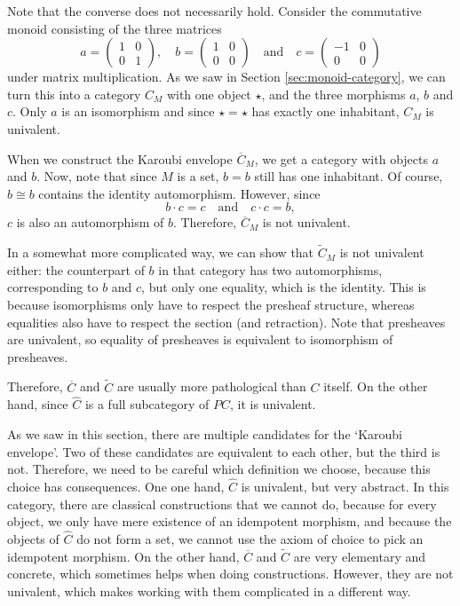 \begin{remark}
  Note that the converse does not necessarily hold. Consider the commutative monoid consisting of the three matrices
  \[
    a = \begin{pmatrix}
      1 & 0\\0 & 1
    \end{pmatrix}, \quad
    b = \begin{pmatrix}
      1 & 0\\0 & 0
    \end{pmatrix} \quad \text{and} \quad
    c = \begin{pmatrix}
      -1 & 0\\0 & 0
    \end{pmatrix}
  \]
  under matrix multiplication. As we saw in Section \ref{sec:monoid-category}, we can turn this into a category $ C_M $ with one object $ \star $, and the three morphisms $ a $, $ b $ and $ c $. Only $ a $ is an isomorphism and since $ \star = \star $ has exactly one inhabitant, $ C_M $ is univalent.

  When we construct the Karoubi envelope $ \overline C_M $, we get a category with objects $ a $ and $ b $. Now, note that since $ M $ is a set, $ b = b $ still has one inhabitant. Of course, $ b \cong b $ contains the identity automorphism. However, since
  \[ b \cdot c = c \quad \text{and} \quad c \cdot c = b, \]
  $ c $ is also an automorphism of $ b $. Therefore, $ \overline C_M $ is not univalent.

  In a somewhat more complicated way, we can show that $ \tilde C_M $ is not univalent either: the counterpart of $ b $ in that category has two automorphisms, corresponding to $ b $ and $ c $, but only one equality, which is the identity. This is because isomorphisms only have to respect the presheaf structure, whereas equalities also have to respect the section (and retraction). Note that presheaves are univalent, so equality of presheaves is equivalent to isomorphism of presheaves.

  Therefore, $ \overline C $ and $ \tilde C $ are usually more pathological than $ C $ itself. On the other hand, since $ \hat C $ is a full subcategory of $ PC $, it is univalent.
\end{remark}

\begin{remark}
  As we saw in this section, there are multiple candidates for the `Karoubi envelope'. Two of these candidates are equivalent to each other, but the third is not. Therefore, we need to be careful which definition we choose, because this choice has consequences. One one hand, $ \hat C $ is univalent, but very abstract. In this category, there are classical constructions that we cannot do, because for every object, we only have mere existence of an idempotent morphism, and because the objects of $ \hat C $ do not form a set, we cannot use the axiom of choice to pick an idempotent morphism. On the other hand, $ \overline C $ and $ \tilde C $ are very elementary and concrete, which sometimes helps when doing constructions. However, they are not univalent, which makes working with them complicated in a different way.
\end{remark}

